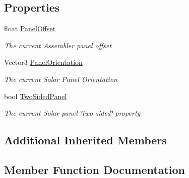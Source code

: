 \subsection*{Properties}
\begin{DoxyCompactItemize}
\item 
float \hyperlink{class_s_e_mod_a_p_i_1_1_a_p_i_1_1_definitions_1_1_cube_blocks_1_1_solar_panel_definition_a1579bb8a805b6ae2da010e93008c87e5}{Panel\+Offset}
\begin{DoxyCompactList}\small\item\em The current Assembler panel offset \end{DoxyCompactList}\item 
Vector3 \hyperlink{class_s_e_mod_a_p_i_1_1_a_p_i_1_1_definitions_1_1_cube_blocks_1_1_solar_panel_definition_a350aa8cd4bbe495fe28606f8d5164301}{Panel\+Orientation}
\begin{DoxyCompactList}\small\item\em The current Solar Panel Orientation \end{DoxyCompactList}\item 
bool \hyperlink{class_s_e_mod_a_p_i_1_1_a_p_i_1_1_definitions_1_1_cube_blocks_1_1_solar_panel_definition_a96e7a804a014d579d3592a835aad6bdc}{Two\+Sided\+Panel}
\begin{DoxyCompactList}\small\item\em The current Solar panel \char`\"{}two sided\char`\"{} property \end{DoxyCompactList}\end{DoxyCompactItemize}
\subsection*{Additional Inherited Members}


\subsection{Member Function Documentation}
\hypertarget{class_s_e_mod_a_p_i_1_1_a_p_i_1_1_definitions_1_1_cube_blocks_1_1_solar_panel_definition_acacfdfdad8977f8e63396428fb070e2e}{}

